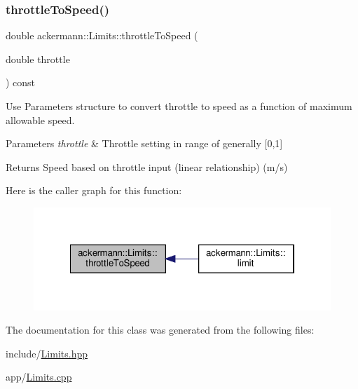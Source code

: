 \subsubsection{\texorpdfstring{throttle\+To\+Speed()}{throttleToSpeed()}}
{\footnotesize\ttfamily double ackermann\+::\+Limits\+::throttle\+To\+Speed (\begin{DoxyParamCaption}\item[{double}]{throttle }\end{DoxyParamCaption}) const}



Use Parameters structure to convert throttle to speed as a function of maximum allowable speed. 


\begin{DoxyParams}{Parameters}
{\em throttle} & Throttle setting in range of generally \mbox{[}0,1\mbox{]} \\
\hline
\end{DoxyParams}
\begin{DoxyReturn}{Returns}
Speed based on throttle input (linear relationship) (m/s) 
\end{DoxyReturn}
Here is the caller graph for this function\+:
\nopagebreak
\begin{figure}[H]
\begin{center}
\leavevmode
\includegraphics[width=322pt]{classackermann_1_1_limits_a0e75c61fc7d5d90c6f64af78d8cf76ff_icgraph}
\end{center}
\end{figure}


The documentation for this class was generated from the following files\+:\begin{DoxyCompactItemize}
\item 
include/\hyperlink{_limits_8hpp}{Limits.\+hpp}\item 
app/\hyperlink{_limits_8cpp}{Limits.\+cpp}\end{DoxyCompactItemize}
